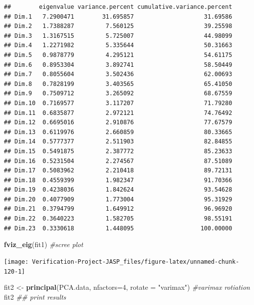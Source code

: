 \documentclass[
]{book}
\newenvironment{Shaded}{\begin{snugshade}}{\end{snugshade}}
\newcommand{\CommentTok}[1]{\textcolor[rgb]{0.56,0.35,0.01}{\textit{#1}}}
\newcommand{\DataTypeTok}[1]{\textcolor[rgb]{0.13,0.29,0.53}{#1}}
\newcommand{\DecValTok}[1]{\textcolor[rgb]{0.00,0.00,0.81}{#1}}
\newcommand{\KeywordTok}[1]{\textcolor[rgb]{0.13,0.29,0.53}{\textbf{#1}}}
\newcommand{\NormalTok}[1]{#1}
\newcommand{\StringTok}[1]{\textcolor[rgb]{0.31,0.60,0.02}{#1}}
\begin{document}
\begin{verbatim}
##        eigenvalue variance.percent cumulative.variance.percent
## Dim.1   7.2900471        31.695857                    31.69586
## Dim.2   1.7388287         7.560125                    39.25598
## Dim.3   1.3167515         5.725007                    44.98099
## Dim.4   1.2271982         5.335644                    50.31663
## Dim.5   0.9878779         4.295121                    54.61175
## Dim.6   0.8953304         3.892741                    58.50449
## Dim.7   0.8055604         3.502436                    62.00693
## Dim.8   0.7828199         3.403565                    65.41050
## Dim.9   0.7509712         3.265092                    68.67559
## Dim.10  0.7169577         3.117207                    71.79280
## Dim.11  0.6835877         2.972121                    74.76492
## Dim.12  0.6695016         2.910876                    77.67579
## Dim.13  0.6119976         2.660859                    80.33665
## Dim.14  0.5777377         2.511903                    82.84855
## Dim.15  0.5491875         2.387772                    85.23633
## Dim.16  0.5231504         2.274567                    87.51089
## Dim.17  0.5083962         2.210418                    89.72131
## Dim.18  0.4559399         1.982347                    91.70366
## Dim.19  0.4238036         1.842624                    93.54628
## Dim.20  0.4077909         1.773004                    95.31929
## Dim.21  0.3794799         1.649912                    96.96920
## Dim.22  0.3640223         1.582705                    98.55191
## Dim.23  0.3330618         1.448095                   100.00000
\end{verbatim}

\begin{Shaded}
\begin{Highlighting}[]
\KeywordTok{fviz_eig}\NormalTok{(fit1) }\CommentTok{#scree plot}
\end{Highlighting}
\end{Shaded}

\texttt{[image: Verification-Project-JASP\_files/figure-latex/unnamed-chunk-120-1]}

\begin{Shaded}
\begin{Highlighting}[]
\NormalTok{fit2 <-}\StringTok{ }\KeywordTok{principal}\NormalTok{(PCA.data, }\DataTypeTok{nfactors=}\DecValTok{4}\NormalTok{, }\DataTypeTok{rotate =} \StringTok{"varimax"}\NormalTok{) }\CommentTok{#varimax rotiation}
\NormalTok{fit2 }\CommentTok{## print results}
\end{Highlighting}
\end{Shaded}
\end{document}
